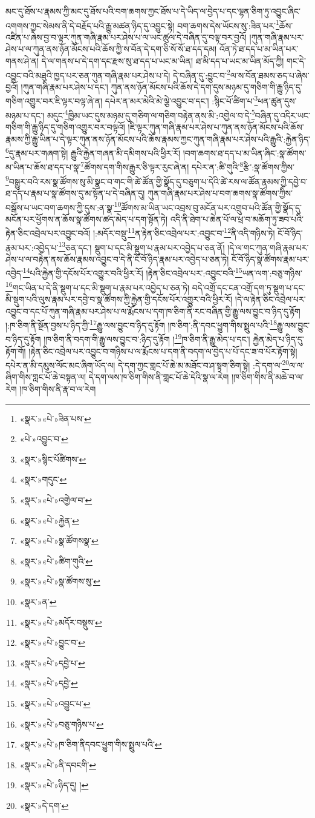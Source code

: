 མང་དུ་ཐོས་པ་རྣམས་ཀྱི་མང་དུ་ཐོས་པའི་བག་ཆགས་ཀྱང་ཐོས་པ་དེ་ཡིད་ལ་བྱེད་པ་དང་ལྷན་ཅིག་ཏུ་འབྱུང་ཞིང་འགགས་ཀྱང་སེམས་ནི་དེ་བརྗོད་པའི་རྒྱུ་མཚན་ཉིད་དུ་འབྱུང་སྟེ། བག་ཆགས་དེས་ཡོངས་སུ་:ཟིན་པར་\footnote{«སྣར་»«པེ་»ཟིན་པས་}ཆོས་འཛིན་པ་ཞེས་བྱ་བ་ལྟར་ཀུན་གཞི་རྣམ་པར་ཤེས་པ་ལ་ཡང་ཚུལ་དེ་བཞིན་དུ་བལྟ་བར་བྱའོ། །ཀུན་གཞི་རྣམ་པར་ཤེས་པ་ལ་ཀུན་ནས་ཉོན་མོངས་པའི་ཆོས་ཀྱི་ས་བོན་དེ་དག་ཅི་སོ་སོ་ཐ་དད་དམ། འོན་ཏེ་ཐ་དད་པ་མ་ཡིན་པར་གནས་ཤེ་ན། དེ་ལ་གནས་པ་དེ་དག་དང་རྫས་སུ་ཐ་དད་པ་ཡང་མ་ཡིན། ཐ་མི་དད་པ་ཡང་མ་ཡིན་མོད་ཀྱི། གང་དེ་འབྱུང་བའི་མཐུའི་ཁྱད་པར་ཅན་ཀུན་གཞི་རྣམ་པར་ཤེས་པ་དེ། དེ་བཞིན་དུ་:བྱུང་བ་\footnote{«པེ་»འབྱུང་བ་}ལ་ས་བོན་ཐམས་ཅད་པ་ཞེས་བྱའོ། །ཀུན་གཞི་རྣམ་པར་ཤེས་པ་དང་། ཀུན་ནས་ཉོན་མོངས་པའི་ཆོས་དེ་དག་དུས་མཉམ་དུ་གཅིག་གི་རྒྱུ་ཉིད་དུ་གཅིག་འགྱུར་བར་ཇི་ལྟར་བལྟ་ཞེ་ན། དཔེར་ན་མར་མེའི་མེ་ལྕེ་འབྱུང་བ་དང་། :སྙིང་པོ་ཚིག་པ་\footnote{«སྣར་»སྙིང་པོཚིགས་}ཕན་ཚུན་དུས་མཉམ་པ་དང་། མདུང་\footnote{«སྣར་»གདུང་}ཁྱིམ་ཡང་དུས་མཉམ་དུ་གཅིག་ལ་གཅིག་བརྟེན་ནས་མི་:འགྱེལ་བ་དེ་\footnote{«སྣར་»«པེ་»འགྱེལ་བ་}བཞིན་དུ་འདིར་ཡང་གཅིག་གི་རྒྱུ་ཉིད་དུ་གཅིག་འགྱུར་བར་བལྟའོ། །ཇི་ལྟར་ཀུན་གཞི་རྣམ་པར་ཤེས་པ་ཀུན་ནས་ཉོན་མོངས་པའི་ཆོས་རྣམས་ཀྱི་རྒྱུ་ཡིན་པ་དེ་ལྟར་ཀུན་ནས་ཉོན་མོངས་པའི་ཆོས་རྣམས་ཀྱང་ཀུན་གཞི་རྣམ་པར་ཤེས་པའི་རྒྱུའི་:རྐྱེན་ཉིད་\footnote{«སྣར་»«པེ་»རྐྱེན་}དུ་རྣམ་པར་གཞག་སྟེ། རྒྱུའི་རྐྱེན་གཞན་མི་དམིགས་པའི་ཕྱིར་རོ། །བག་ཆགས་ཐ་དད་པ་མ་ཡིན་ཞིང་:སྣ་ཚོགས་མ་ཡིན་པ་ཆོས་ཐ་དད་པ་སྣ་\footnote{«སྣར་»«པེ་»སྣ་ཚོགསསྣ་}ཚོགས་དག་གིས་རྒྱུར་ཅི་ལྟར་རུང་ཞེ་ན། དཔེར་ན་:ཚི་གུའི་\footnote{«སྣར་»«པེ་»ཚིག་གུའི་}རྩི་:སྣ་ཚོགས་ཀྱིས་\footnote{«སྣར་»«པེ་»སྣ་ཚོགས་སུ་}བསྒྱུར་བའི་རས་སྣ་ཚོགས་སུ་མི་སྣང་བ་གང་གི་ཚེ་ཚོན་གྱི་སྣོད་དུ་བཅུག་པ་དེའི་ཚེ་རས་ལ་ཚོན་རྣམས་ཀྱི་དབྱེ་བ་ཐ་དད་པ་རྣམ་པ་སྣ་ཚོགས་དུ་མ་སྟོན་པ་དེ་བཞིན་དུ། ཀུན་གཞི་རྣམ་པར་ཤེས་པ་བག་ཆགས་སྣ་ཚོགས་ཀྱིས་བསྒོས་པ་ཡང་བག་ཆགས་ཀྱི་དུས་:ན་སྣ་\footnote{«སྣར་»ན་}ཚོགས་མ་ཡིན་ཡང་འབྲས་བུ་མངོན་པར་འགྲུབ་པའི་ཚོན་གྱི་སྣོད་དུ་མངོན་པར་ཕྱོགས་ན་ཆོས་སྣ་ཚོགས་ཚད་མེད་པ་དག་སྟོན་ཏེ། འདི་ནི་ཐེག་པ་ཆེན་པོ་ལ་ཕྲ་བ་མཆོག་ཏུ་ཟབ་པའི་རྟེན་ཅིང་འབྲེལ་པར་འབྱུང་བའོ། །:མདོར་བསྡུ་\footnote{«སྣར་»«པེ་»མདོར་བསྡུས་}ན་རྟེན་ཅིང་འབྲེལ་པར་:འབྱུང་བ་\footnote{«སྣར་»«པེ་»བྱུང་བ་}ནི་འདི་གཉིས་ཏེ། ངོ་བོ་ཉིད་རྣམ་པར་:འབྱེད་པ་\footnote{«སྣར་»«པེ་»དབྱེ་པ་}ཅན་དང་། སྡུག་པ་དང་མི་སྡུག་པ་རྣམ་པར་འབྱེད་པ་ཅན་ནོ། །དེ་ལ་གང་ཀུན་གཞི་རྣམ་པར་ཤེས་པ་ལ་བརྟེན་ནས་ཆོས་རྣམས་འབྱུང་བ་དེ་ནི་ངོ་བོ་ཉིད་རྣམ་པར་འབྱེད་པ་ཅན་ཏེ། ངོ་བོ་ཉིད་སྣ་ཚོགས་རྣམ་པར་འབྱེད་\footnote{«སྣར་»«པེ་»དབྱེ་}པའི་རྐྱེན་གྱི་དངོས་པོར་འགྱུར་བའི་ཕྱིར་རོ། །རྟེན་ཅིང་འབྲེལ་པར་:འབྱུང་བའི་\footnote{«སྣར་»«པེ་»འབྱུང་པ་}ཡན་ལག་:བཅུ་གཉིས་\footnote{«སྣར་»«པེ་»བཅུ་གཉིས་པ་}གང་ཡིན་པ་དེ་ནི་སྡུག་པ་དང་མི་སྡུག་པ་རྣམ་པར་འབྱེད་པ་ཅན་ཏེ། བདེ་འགྲོ་དང་ངན་འགྲོ་དག་ཏུ་སྡུག་པ་དང་མི་སྡུག་པའི་ལུས་རྣམ་པར་དབྱེ་བ་སྣ་ཚོགས་ཀྱི་རྐྱེན་གྱི་དངོས་པོར་འགྱུར་བའི་ཕྱིར་རོ། །དེ་ལ་རྟེན་ཅིང་འབྲེལ་པར་འབྱུང་བ་དང་པོ་ཀུན་གཞི་རྣམ་པར་ཤེས་པ་ལ་རྨོངས་པ་དག་ཁ་ཅིག་ནི་རང་བཞིན་གྱི་རྒྱུ་ལས་བྱུང་བ་ཉིད་དུ་རྟོག །:ཁ་ཅིག་ནི་སྔོན་བྱས་པ་ཉིད་ཀྱི་\footnote{«སྣར་»«པེ་»ཁ་ཅིག་ནིདབང་ཕྱུག་གིས་སྤྲུལ་པའི་}རྒྱུ་ལས་བྱུང་བ་ཉིད་དུ་རྟོག །ཁ་ཅིག་:ནི་དབང་ཕྱུག་གིས་སྤྲུལ་པའི་\footnote{«སྣར་»«པེ་»ནི་དབངགི་}རྒྱུ་ལས་བྱུང་བ་ཉིད་དུ་རྟོག །ཁ་ཅིག་ནི་བདག་གི་རྒྱུ་ལས་བྱུང་བ་:ཉིད་དུ་རྟོག །\footnote{«སྣར་»«པེ་»ཉིད་དུ། །}ཁ་ཅིག་ནི་རྒྱུ་མེད་པ་དང་། རྐྱེན་མེད་པ་ཉིད་དུ་རྟོག་གོ། །རྟེན་ཅིང་འབྲེལ་པར་འབྱུང་བ་གཉིས་པ་ལ་རྨོངས་པ་དག་ནི་བདག་ལ་བྱེད་པ་པོ་དང་ཟ་བ་པོར་རྟོག་སྟེ། དཔེར་ན་མི་དམུས་ལོང་མང་ཞིག་ཡོད་ལ། དེ་དག་ཀྱང་གླང་པོ་ཆེ་མ་མཐོང་བ་ཤ་སྟག་ཅིག་སྟེ། :དེ་དག་ལ་\footnote{«སྣར་»དེ་དག་}ལ་ལ་ཞིག་གིས་གླང་པོ་ཆེ་བསྟན་ལ། དེ་དག་ལས་ཁ་ཅིག་གིས་ནི་གླང་པོ་ཆེ་དེའི་སྣ་ལ་རེག །ཁ་ཅིག་གིས་ནི་མཆེ་བ་ལ་རེག །ཁ་ཅིག་གིས་ནི་རྣ་བ་ལ་རེག 